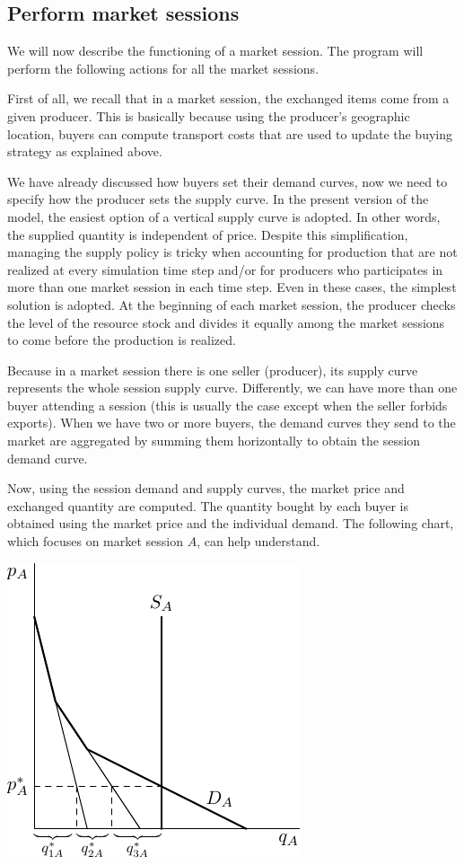 \documentclass{article}
\begin{document}
\subsection{Perform market sessions}

We will now describe the functioning of a market session. The program will perform the following actions for all the market sessions.

First of all, we recall that in a market session, the exchanged items come from a given producer. This is basically because using the producer's geographic location, buyers can compute transport costs that are used to update the buying strategy as explained above.

We have already discussed how buyers set their demand curves, now we need to specify how the producer sets the supply curve. In the present version of the model, the easiest option of a vertical supply curve is adopted. In other words, the supplied quantity is independent of price. Despite this simplification, managing the supply policy is tricky when accounting for production that are not realized at every simulation time step and/or for producers who participates in more than one market session in each time step. 
Even in these cases, the simplest solution is adopted. At the beginning of each market session, the producer checks the level of the resource stock and divides it equally among the market sessions to come before the production is realized.   

Because in a market session there is one seller (producer), its supply curve represents the whole session supply curve. Differently, we can have more than one buyer attending a session (this is usually the case except when the seller forbids exports). When we have two or more buyers, the demand curves they send to the market are aggregated by summing them horizontally to obtain the session demand curve.

Now, using the session demand and supply curves, the market price and exchanged quantity are computed. The quantity bought by each buyer is obtained using the market price and the individual demand.
The following chart, which focuses on market session $A$, can help understand.

\vskip5mm
\centerline{\includegraphics{fig_market_equilibrium-0.pdf}}
\end{document}
